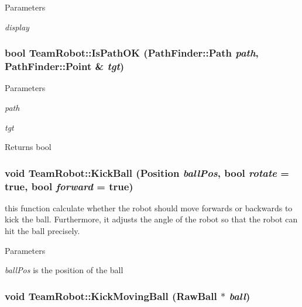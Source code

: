 \begin{DoxyParams}{Parameters}
\item[{\em display}]\end{DoxyParams}
\hypertarget{classTeamRobot_afb5f9191ca185053af37c1ae1f8dcb17}{
\subsubsection[{IsPathOK}]{\setlength{\rightskip}{0pt plus 5cm}bool TeamRobot::IsPathOK ({\bf PathFinder::Path} {\em path}, \/  {\bf PathFinder::Point} \& {\em tgt})}}
\label{classTeamRobot_afb5f9191ca185053af37c1ae1f8dcb17}

\begin{DoxyParams}{Parameters}
\item[{\em path}]\item[{\em tgt}]\end{DoxyParams}
\begin{DoxyReturn}{Returns}
bool 
\end{DoxyReturn}
\hypertarget{classTeamRobot_a36d006bfeadfcdd37bd1eeb47223bdba}{
\subsubsection[{KickBall}]{\setlength{\rightskip}{0pt plus 5cm}void TeamRobot::KickBall (Position {\em ballPos}, \/  bool {\em rotate} = {\ttfamily true}, \/  bool {\em forward} = {\ttfamily true})}}
\label{classTeamRobot_a36d006bfeadfcdd37bd1eeb47223bdba}


this function calculate whether the robot should move forwards or backwards to kick the ball. Furthermore, it adjusts the angle of the robot so that the robot can hit the ball precisely. 


\begin{DoxyParams}{Parameters}
\item[{\em ballPos}]is the position of the ball \end{DoxyParams}
\hypertarget{classTeamRobot_a98d044ad3907493236b2d399a26cb9ac}{
\subsubsection[{KickMovingBall}]{\setlength{\rightskip}{0pt plus 5cm}void TeamRobot::KickMovingBall (RawBall $\ast$ {\em ball})}}
\label{classTeamRobot_a98d044ad3907493236b2d399a26cb9ac}

